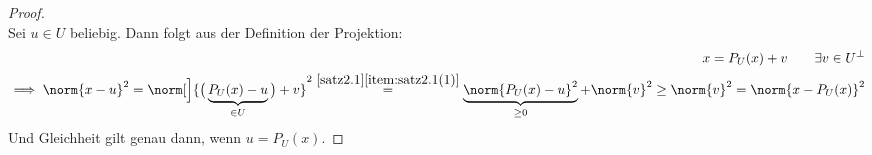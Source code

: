 \begin{proof}
	\\
	Sei $u\in U$ beliebig.
	Dann folgt aus der Definition der Projektion:
	\begin{align*}
		x=P_U(x)+v\qquad\exists v\in U^\perp\\
		\implies\norm{x-u}^2=\norm[\Big]{\big(\underbrace{P_U(x)-u}_{\in U}\big) +v}^2
		\overset{\ref{satz2.1}\ref{item:satz2.1(1)}}{=}
		\underbrace{\norm{P_U(x)-u}^2}_{\geq0}+\norm{v}^2
		\geq\norm{v}^2=\norm{x-P_U(x)}^2
	\end{align*}
	Und Gleichheit gilt genau dann, wenn $u=P_U(x)$.\nl
\end{proof}



